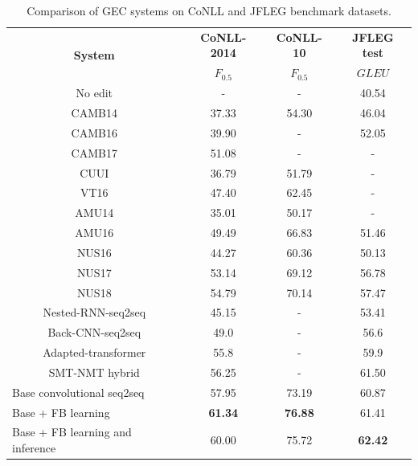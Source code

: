 \documentclass{article} %
\begin{document}
\begin{table}[t]
\centering
\small
\begin{tabular}{c|c|c|c}
\hline
\multirow{2}{*}{\textbf{System}} & \textbf{CoNLL-2014} & \textbf{CoNLL-10} & \textbf{JFLEG test} \\
                                 & $F_{0.5}$                   & $F_{0.5}$                 & $GLEU$                \\ \hline
No edit                          & -                   & -                 & 40.54               \\
CAMB14                           & 37.33               & 54.30             & 46.04            \\
CAMB16                           & 39.90               & -                 & 52.05               \\
CAMB17 & 51.08 & - & - \\
CUUI & 36.79 & 51.79 & - \\
VT16 & 47.40 & 62.45 & - \\
AMU14 & 35.01 & 50.17 & - \\
AMU16                            & 49.49               & 66.83             & 51.46               \\
NUS16                            & 44.27               & 60.36             & 50.13               \\
NUS17                            & 53.14               & 69.12             & 56.78               \\
NUS18                            & 54.79               & 70.14                 & 57.47               \\
Nested-RNN-seq2seq                   & 45.15               & -                 & 53.41               \\
Back-CNN-seq2seq & 49.0 &  - & 56.6 \\
Adapted-transformer & 55.8 & - & 59.9 \\
SMT-NMT hybrid                   & 56.25               & -             & 61.50               \\ \hline
\multicolumn{1}{l|}{Base convolutional seq2seq}   &  57.95       &          73.19           &        60.87          \\
\multicolumn{1}{l|}{Base + FB learning}      &    \bf 61.34    &   \bf 76.88 &  61.41    \\
\multicolumn{1}{l|}{Base + FB learning and inference}        &        60.00        & 75.72 & \bf 62.42               \\ \hline
\end{tabular}
\caption{Comparison of GEC systems on CoNLL and JFLEG benchmark datasets.}
\label{tab:gec_result}
\end{table}
\end{document}

